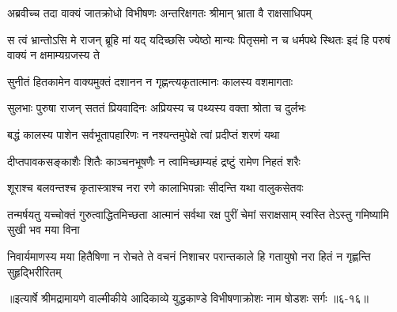 \twolineshloka
{अब्रवीच्च तदा वाक्यं जातक्रोधो विभीषणः}
{अन्तरिक्षगतः श्रीमान् भ्राता वै राक्षसाधिपम्} %

\threelineshloka
{स त्वं भ्रान्तोऽसि मे राजन् ब्रूहि मां यद् यदिच्छसि}
{ज्येष्ठो मान्यः पितृसमो न च धर्मपथे स्थितः}
{इदं हि परुषं वाक्यं न क्षमाम्यग्रजस्य ते} %

\twolineshloka
{सुनीतं हितकामेन वाक्यमुक्तं दशानन}
{न गृह्णन्त्यकृतात्मानः कालस्य वशमागताः} %

\twolineshloka
{सुलभाः पुरुषा राजन् सततं प्रियवादिनः}
{अप्रियस्य च पथ्यस्य वक्ता श्रोता च दुर्लभः} %

\twolineshloka
{बद्धं कालस्य पाशेन सर्वभूतापहारिणः}
{न नश्यन्तमुपेक्षे त्वां प्रदीप्तं शरणं यथा} %

\twolineshloka
{दीप्तपावकसङ्काशैः शितैः काञ्चनभूषणैः}
{न त्वामिच्छाम्यहं द्रष्टुं रामेण निहतं शरैः} %

\twolineshloka
{शूराश्च बलवन्तश्च कृतास्त्राश्च नरा रणे}
{कालाभिपन्नाः सीदन्ति यथा वालुकसेतवः} %

\threelineshloka
{तन्मर्षयतु यच्चोक्तं गुरुत्वाद्धितमिच्छता}
{आत्मानं सर्वथा रक्ष पुरीं चेमां सराक्षसाम्}
{स्वस्ति तेऽस्तु गमिष्यामि सुखी भव मया विना} %

\twolineshloka
{निवार्यमाणस्य मया हितैषिणा न रोचते ते वचनं निशाचर}
{परान्तकाले हि गतायुषो नरा हितं न गृह्णन्ति सुहृद्भिरीरितम्} %


॥इत्यार्षे श्रीमद्रामायणे वाल्मीकीये आदिकाव्ये युद्धकाण्डे विभीषणाक्रोशः नाम षोडशः सर्गः ॥६-१६॥
